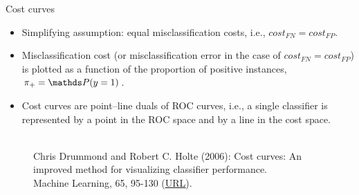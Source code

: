 \begin{vbframe}{Cost curves}

\begin{footnotesize}

\begin{itemize}
  \item Simplifying assumption: equal misclassification costs, i.e.,
  $cost_{FN} = cost_{FP}$.
  \item Misclassification cost (or misclassification error in the case of
  $cost_{FN} = cost_{FP}$) is plotted as a function of the proportion of
  positive instances, $\rp = \P(y = 1)$.
  \item Cost curves are point–line duals of ROC curves, i.e., a single
  classifier is represented by a point in the ROC space and by a line in the
  cost space.
\end{itemize}

\end{footnotesize}

\begin{figure}
  \centering
  \tiny
  \\Chris Drummond and Robert C. Holte (2006): Cost curves: An improved
  method for visualizing classifier performance. \\Machine Learning, 65, 95-130
  (\href{https://www.semanticscholar.org/paper/Cost-curves\%3A-An-improved-method-for  -visualizing-Drummond-Holte/71708ce984e0896e7383435913547e770572410e}
  {\underline{URL}}).
\end{figure}


\end{vbframe}


